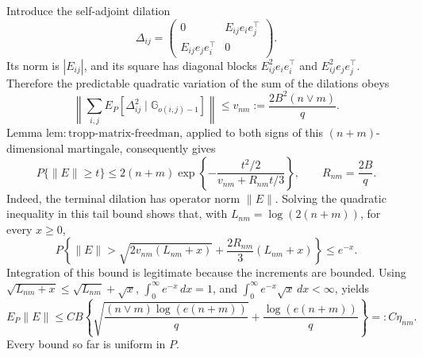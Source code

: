 Introduce the self-adjoint dilation
\[
 \Delta_{ij}=
 \begin{pmatrix}
 0&E_{ij}e_ie_j^\top\\
 E_{ij}e_je_i^\top&0
 \end{pmatrix}.
\]
Its norm is \(|E_{ij}|\), and its square has diagonal blocks
\(E_{ij}^2e_ie_i^\top\) and \(E_{ij}^2e_je_j^\top\).  Therefore the predictable quadratic variation of the sum of the dilations obeys
\[
 \left\lVert\sum_{i,j}E_P[\Delta_{ij}^2
 \mid\mathbb G_{o(i,j)-1}]\right\rVert
 \le v_{nm}:=\frac{2B^2(n\vee m)}q.
\]
Lemma \(\mathrm{lem:tropp\mbox{-}matrix\mbox{-}freedman}\), applied to both signs of this \((n+m)\)-dimensional martingale, consequently gives
\[
 P\{\lVert E\rVert\ge t\}
 \le2(n+m)\exp\!\left\{-\frac{t^2/2}{v_{nm}+R_{nm}t/3}\right\},
 \qquad R_{nm}=\frac{2B}{q}.
\]
Indeed, the terminal dilation has operator norm \(\lVert E\rVert\).  Solving the quadratic inequality in this tail bound shows that, with \(L_{nm}=\log(2(n+m))\), for every \(x\ge0\),
\[
 P\!\left\{\lVert E\rVert>
 \sqrt{2v_{nm}(L_{nm}+x)}+
 \frac{2R_{nm}}3(L_{nm}+x)\right\}\le e^{-x}.
\]
Integration of this bound is legitimate because the increments are bounded.  Using
\(\sqrt{L_{nm}+x}\le\sqrt{L_{nm}}+\sqrt x\),
\(\int_0^\infty e^{-x}\,dx=1\), and
\(\int_0^\infty e^{-x}\sqrt x\,dx<\infty\), yields
\[
 E_P\lVert E\rVert
 \le C B\left\{
 \sqrt{\frac{(n\vee m)\log(e(n+m))}{q}}+
 \frac{\log(e(n+m))}{q}\right\}
 =:C\eta_{nm}.
\]
Every bound so far is uniform in \(P\).

